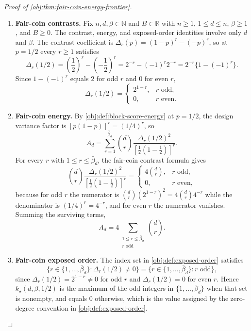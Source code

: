 \begin{proof}[Proof of \cref{obj:thm:fair-coin-energy-frontier}]
\begin{enumerate}
\item \textbf{Fair-coin contrasts.}
Fix \(n,d,\beta\in\mathbb N\) and \(B\in\mathbb R\) with \(n\ge1\), \(1\le d\le n\), \(\beta\ge1\), and \(B\ge0\).  The contrast, energy, and exposed-order identities involve only \(d\) and \(\beta\).  The contrast coefficient is \(\Delta_r(p)=(1-p)^r-(-p)^r\), so at \(p=1/2\) every \(r\ge1\) satisfies
\[
\Delta_r(1/2)
=
\left(\frac12\right)^r-\left(-\frac12\right)^r
=
2^{-r}-(-1)^r2^{-r}
=
2^{-r}\bigl\{1-(-1)^r\bigr\}.
\]
Since \(1-(-1)^r\) equals \(2\) for odd \(r\) and \(0\) for even \(r\),
\[
\Delta_r(1/2)=
\begin{cases}
2^{1-r}, & r\text{ odd},\\
0, & r\text{ even}.
\end{cases}
\] %

\item \textbf{Fair-coin energy.}
By \cref{obj:def:block-score-energy} at \(p=1/2\), the design variance factor is \([p(1-p)]^r=(1/4)^r\), so
\[
A_d
=
\sum_{r=1}^{\bar\beta_d}
\binom{d}{r}
\frac{\Delta_r(1/2)^2}{\left[\frac12\left(1-\frac12\right)\right]^r}.
\]
For every \(r\) with \(1\le r\le\bar\beta_d\), the fair-coin contrast formula gives
\[
\binom{d}{r}
\frac{\Delta_r(1/2)^2}{\left[\frac12\left(1-\frac12\right)\right]^r}
=
\begin{cases}
4\binom{d}{r}, & r\text{ odd},\\
0, & r\text{ even},
\end{cases}
\]
because for odd \(r\) the numerator is \(\binom dr(2^{1-r})^2=4\binom dr4^{-r}\) while the denominator is \((1/4)^r=4^{-r}\), and for even \(r\) the numerator vanishes.  Summing the surviving terms,
\[
A_d
=
4\sum_{\substack{1\le r\le \bar\beta_d\\ r\text{ odd}}}
\binom{d}{r}.
\] %

\item \textbf{Fair-coin exposed order.}
The index set in \cref{obj:def:exposed-order} satisfies
\[
\bigl\{r\in\{1,\ldots,\bar\beta_d\}:\Delta_r(1/2)\ne0\bigr\}
=
\bigl\{r\in\{1,\ldots,\bar\beta_d\}:r\text{ odd}\bigr\},
\]
since \(\Delta_r(1/2)=2^{1-r}\ne0\) for odd \(r\) and \(\Delta_r(1/2)=0\) for even \(r\).  Hence \(k_\star(d,\beta,1/2)\) is the maximum of the odd integers in \(\{1,\ldots,\bar\beta_d\}\) when that set is nonempty, and equals \(0\) otherwise, which is the value assigned by the zero-degree convention in \cref{obj:def:exposed-order}. %


\end{enumerate}
\end{proof}
